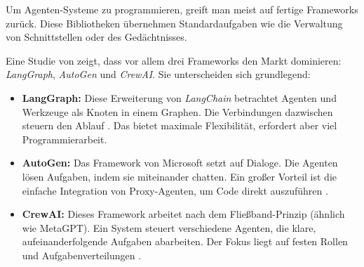 Um Agenten-Systeme zu programmieren, greift man meist auf fertige Frameworks zurück. Diese Bibliotheken übernehmen Standardaufgaben wie die Verwaltung von Schnittstellen oder des Gedächtnisses.

Eine Studie von \textcite{liuLargescaleStudyDevelopment2025} zeigt, dass vor allem drei Frameworks den Markt dominieren: \textit{LangGraph}, \textit{AutoGen} und \textit{CrewAI}. Sie unterscheiden sich grundlegend:

\begin{itemize}
\item \textbf{LangGraph:} Diese Erweiterung von \textit{LangChain} betrachtet Agenten und Werkzeuge als Knoten in einem Graphen. Die Verbindungen dazwischen steuern den Ablauf \parencite{langchain2024}. Das bietet maximale Flexibilität, erfordert aber viel Programmierarbeit.
\item \textbf{AutoGen:} Das Framework von Microsoft setzt auf Dialoge. Die Agenten lösen Aufgaben, indem sie miteinander chatten. Ein großer Vorteil ist die einfache Integration von Proxy-Agenten, um Code direkt auszuführen \parencite{wuAutogenEnablingNextgen2024}.
\item \textbf{CrewAI:} Dieses Framework arbeitet nach dem Fließband-Prinzip (ähnlich wie MetaGPT). Ein System steuert verschiedene Agenten, die klare, aufeinanderfolgende Aufgaben abarbeiten. Der Fokus liegt auf festen Rollen und Aufgabenverteilungen \parencite{liuLargescaleStudyDevelopment2025}.
\end{itemize}

